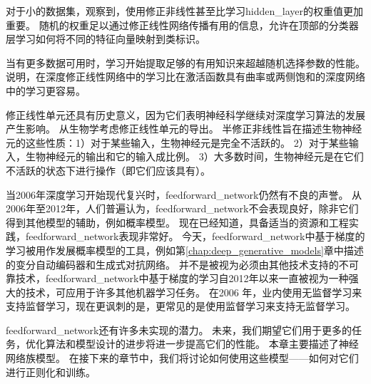 对于小的数据集，\cite{Jarrett-ICCV2009-small}观察到，使用修正非线性甚至比学习\gls{hidden_layer}的权重值更加重要。
随机的权重足以通过修正线性网络传播有用的信息，允许在顶部的分类器层学习如何将不同的特征向量映射到类标识。

当有更多数据可用时，学习开始提取足够的有用知识来超越随机选择参数的性能。
\cite{Glorot+al-AI-2011-small}说明，在深度修正线性网络中的学习比在激活函数具有曲率或两侧饱和的深度网络中的学习更容易。

修正线性单元还具有历史意义，因为它们表明神经科学继续对深度学习算法的发展产生影响。
\cite{Glorot+al-AI-2011-small}从生物学考虑修正线性单元的导出。
半修正非线性旨在描述生物神经元的这些性质：1）对于某些输入，生物神经元是完全不活跃的。
2）对于某些输入，生物神经元的输出和它的输入成比例。
3）大多数时间，生物神经元是在它们不活跃的状态下进行操作（即它们应该具有）。
  
  
当2006年深度学习开始现代复兴时，\gls{feedforward_network}仍然有不良的声誉。
从2006年至2012年，人们普遍认为，\gls{feedforward_network}不会表现良好，除非它们得到其他模型的辅助，例如概率模型。
现在已经知道，具备适当的资源和工程实践，\gls{feedforward_network}表现非常好。
今天，\gls{feedforward_network}中基于梯度的学习被用作发展概率模型的工具，例如第\ref{chap:deep_generative_models}章中描述的变分自动编码器和生成式对抗网络。
并不是被视为必须由其他技术支持的不可靠技术，\gls{feedforward_network}中基于梯度的学习自2012年以来一直被视为一种强大的技术，可应用于许多其他机器学习任务。
在2006 年，业内使用无监督学习来支持监督学习，现在更讽刺的是，更常见的是使用监督学习来支持无监督学习。

\gls{feedforward_network}还有许多未实现的潜力。
未来，我们期望它们用于更多的任务，优化算法和模型设计的进步将进一步提高它们的性能。
本章主要描述了神经网络族模型。
在接下来的章节中，我们将讨论如何使用这些模型——如何对它们进行正则化和训练。

  
  
